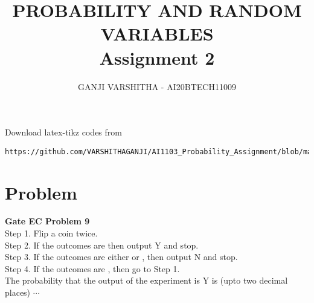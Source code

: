 \documentclass[journal,12pt,twocolumn]{IEEEtran}
\begin{document}
     \def\centbox#1{\makebox[0in]{#1}}
     \def\topbox#1{\raisebox{-\baselineskip}[0in][0in]{#1}}
     \def\midbox#1{\raisebox{-0.5\baselineskip}[0in][0in]{#1}}
\vspace{3cm}
\title{\textbf{PROBABILITY AND RANDOM VARIABLES \\ Assignment 2}}
\author{GANJI VARSHITHA - AI20BTECH11009}
\maketitle
\newpage
\bigskip
\renewcommand{\thefigure}{\theenumi}
\renewcommand{\thetable}{\theenumi}
Download latex-tikz codes from 
%
\begin{lstlisting}
https://github.com/VARSHITHAGANJI/AI1103_Probability_Assignment/blob/main/Assignment2.tex
\end{lstlisting}
\section*{Problem}
\textbf{Gate EC Problem 9 }
\\
Step 1. Flip a coin twice.\\
Step 2. If the outcomes are 
then output Y and stop.\\
Step 3. If the outcomes are either  or , then output N
and stop.\\
Step 4. If the outcomes are ,
then go to Step 1.\\
The probability that the output of the experiment is Y is (upto two decimal places) $\cdots$
\end{document}
